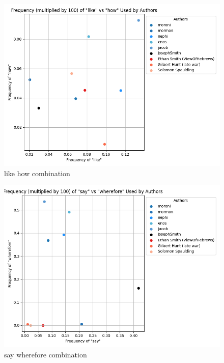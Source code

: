 \documentclass[
  letterpaper,
  DIV=11,
  numbers=noendperiod]{scrartcl}
\begin{document}
\begin{figure}

{\centering \includegraphics{Graphs/Word Comparisons/like_how_output.png}

}

\caption{like how combination}

\end{figure}

\begin{figure}

{\centering \includegraphics{Graphs/Word Comparisons/say_wherefore_output.png}

}

\caption{say wherefore combination}

\end{figure}
\end{document}
